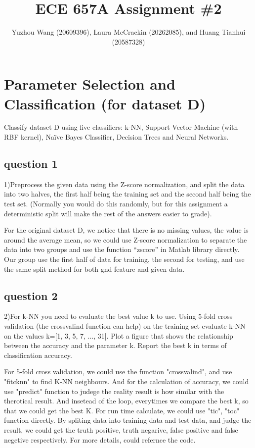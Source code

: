 \documentclass[]{article}
\title{ECE 657A Assignment \#2}
\author{Yuzhou Wang (20609396), Laura McCrackin (20262085), \newline and   Huang Tianhui (20587328)       }
\begin{document}
\maketitle



\section{Parameter Selection and Classification (for dataset D)}
Classify dataset D using five classifiers: k-NN, Support Vector Machine (with RBF kernel), Naïve Bayes Classifier, Decision Trees and Neural Networks. 
\subsection{question 1}
1)Preprocess the given data using the Z-score normalization, and split the data into two halves, the first half being the training set and the second half being the test set. (Normally you would do this randomly, but for this assignment a deterministic split will make the rest of the answers easier to grade).

For the original dataset D, we notice that there is no missing values, the value is around the average mean, so we could use Z-score normalization to separate the data into two groups and use the function “zscore” in Matlab library directly. Our group use the first half of data for training, the second for testing, and use the same split method for both gnd feature and given data.




\subsection{question 2}
2)For k-NN you need to evaluate the best value k to use. Using 5-fold cross validation (the crossvalind function can help) on the training set evaluate k-NN on the values k=[1, 3, 5, 7, ..., 31]. Plot a figure that shows the relationship between the accuracy and the parameter k. Report the best k in terms of classification accuracy.

For 5-fold cross validation, we could use the function "crossvalind", and use "fitcknn" to find K-NN neighbours. And for the calculation of accuracy, we could use "predict" function to judege the reality result is how similar with the therotical result. And insetead of the loop, everytimes we compare the best k, so that we could get the best K. For run time calculate, we could use "tic", "toc" function directly. By spliting data into training data and test data, and judge the result, we could get the truth positive, truth negarive, false positive and false negetive respectively. For more details, could refernce the code.
\end{document}
